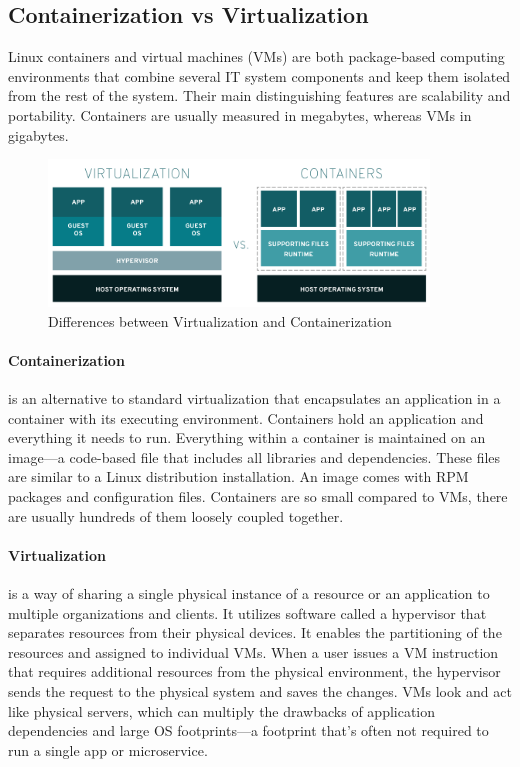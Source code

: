 	\subsection{Containerization vs Virtualization}
	Linux containers and virtual machines (VMs) are both package-based computing environments that combine several IT system components and keep them isolated from the rest of the system. Their main distinguishing features are scalability and portability. Containers are usually measured in megabytes, whereas VMs in gigabytes.
	\cite{containersRedHat}
	\begin{figure}[H]
		\centering
		\includegraphics[width=0.9\textwidth]{"Bilder/virtualization-vs-containers_transparent.png"}
		\caption{Differences between Virtualization and Containerization \cite{containersRedHat}}
		\label{fig:Background:Containers:Containers vs VMs}					
	\end{figure}

	\paragraph*{Containerization} is an alternative to standard virtualization that encapsulates an application in a container with its executing environment.
	Containers hold an application and everything it needs to run. Everything within a container is maintained on an image—a code-based file that includes all libraries and dependencies. These files are similar to a Linux distribution installation. An image comes with RPM packages and configuration files. Containers are so small compared to VMs, there are usually hundreds of them loosely coupled together.\cite{containersRedHat}
	
	\paragraph*{Virtualization} is a way of sharing a single physical instance of a resource or an application to multiple organizations and clients. It utilizes software called a hypervisor that separates resources from their physical devices. It enables the partitioning of the resources and assigned to individual VMs. When a user issues a VM instruction that requires additional resources from the physical environment, the hypervisor sends the request to the physical system and saves the changes. VMs look and act like physical servers, which can multiply the drawbacks of application dependencies and large OS footprints—a footprint that's often not required to run a single app or microservice.\cite{containersRedHat} \\

